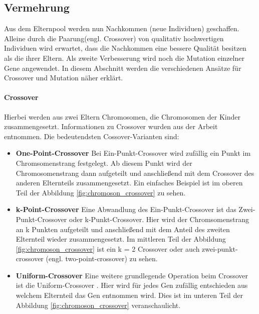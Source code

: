 \subsection{Vermehrung} \label{Grundlagen_vermehrung}
Aus dem Elternpool werden nun Nachkommen (neue Individuen) geschaffen. Alleine durch die Paarung(engl. Crossover) von qualitativ hochwertigen Individuen wird erwartet, dass die Nachkommen eine bessere Qualität besitzen als die ihrer Eltern. Als zweite Verbesserung wird noch die Mutation einzelner Gene angewendet. In diesem Abschnitt werden die verschiedenen Ansätze für Crossover und Mutation näher erklärt.

\paragraph{Crossover} Hierbei werden aus zwei Eltern Chromosomen, die Chromosomen der Kinder zusammengesetzt. Informationen zu Crossover wurden aus der Arbeit \cite{Umbarkar2015} entnommen. Die bedeutendsten Cossover-Varianten sind:

\begin{itemize}
\item \textbf{One-Point-Crossover}
Bei Ein-Punkt-Crossover wird zufällig ein Punkt im Chromsomenstrang festgelegt. Ab diesem Punkt wird der Chromosomenstrang dann aufgeteilt und anschließend mit dem Crossover des anderen Elternteils zusammengesetzt. Ein einfaches Beispiel ist im oberen Teil der Abbildung \ref{fig:chromoson_crossover} zu sehen.

\item \textbf{k-Point-Crossover}
Eine Abwandlung des Ein-Punkt-Crossover ist das Zwei-Punkt-Crossover oder k-Punkt-Crossover. Hier wird der Chromsomenstrang an k Punkten aufgeteilt und anschließend mit dem Anteil des zweiten Elternteil wieder zusammengesetzt. Im mittleren Teil der Abbildung \ref{fig:chromoson_crossover} ist ein k = 2 Crossover oder auch zwei-punkt-crossover (engl. two-point-crossover) zu sehen.

\item \textbf{Uniform-Crossover}
Eine weitere grundlegende Operation beim Crossover ist die Uniform-Crossover \cite{Syswerda1989}. Hier wird für jedes Gen zufällig entschieden aus welchem Elternteil das Gen entnommen wird. Dies ist im unteren Teil der Abbildung \ref{fig:chromoson_crossover} veranschaulicht.
\end{itemize}

